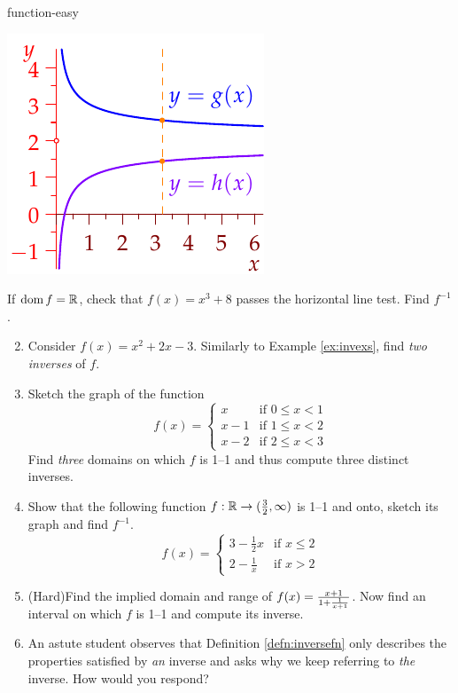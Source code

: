 \begin{example}{}{function-easy}
\begin{description}
\begin{minipage}[t]{0.31\linewidth}
			\includegraphics{functions-easyex2}
		\end{minipage}
	\end{description}
\end{example}



\begin{exercises}{}{}
	\exstart If $\operatorname{dom} f=\mathbb{R}$, check that $f(x)=x^3+8$ passes the horizontal line test. Find $f^{-1}$.
	
	\begin{enumerate}\setcounter{enumi}{1}
	  \item Consider $f(x)=x^2+2x-3$. Similarly to Example \ref{ex:invexs}, find \emph{two inverses} of $f$.
	  
	  \item Sketch the graph of the function
	  \[
	  	f(x)=
	  	\begin{cases}
	  		x&\text{if }0\le x<1\\
	  		x-1&\text{if }1\le x<2\\
	  		x-2&\text{if }2\le x<3
	  	\end{cases}
	  \]
		Find \emph{three} domains on which $f$ is 1--1 and thus compute three distinct inverses.
	
	  \item Show that the following function $f:\mathbb{R}\to(\frac 32,\infty)$ is 1--1 and onto, sketch its graph and find $f^{-1}$. 
	  \[f(x)=\begin{cases}
	  3-\frac 12x&\text{if }x\le 2\\
	  2-\frac 1x&\text{if }x>2
	  \end{cases}\]
	  
	  \item (Hard)\lstsp Find the implied domain and range of $f(x)=\smash[b]{\frac{x+1}{1+\frac 1{x+1}}}$. Now find an interval on which $f$ is 1--1 and compute its inverse.
	  
	  \item An astute student observes that Definition \ref{defn:inversefn} only describes the properties satisfied by \emph{an} inverse and asks why we keep referring to \emph{the} inverse. How would you respond?
	  
	\end{enumerate}
\end{exercises}

